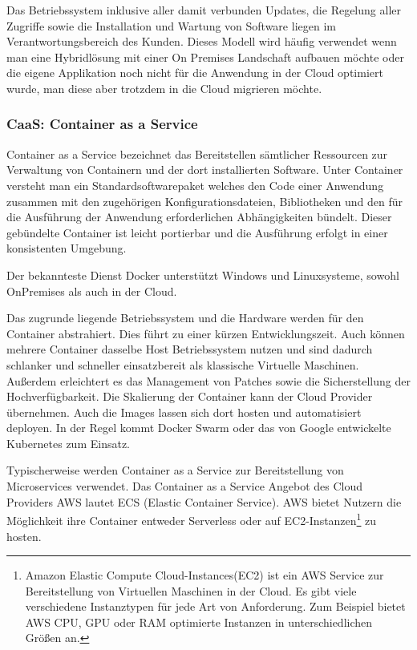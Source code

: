    Das Betriebssystem inklusive aller damit verbunden Updates, die Regelung aller Zugriffe sowie die Installation und Wartung von Software liegen im Verantwortungsbereich des Kunden.
   Dieses Modell wird häufig verwendet wenn man eine Hybridlösung mit einer On Premises Landschaft aufbauen möchte oder die eigene Applikation noch nicht für die Anwendung in der Cloud optimiert wurde, man diese aber trotzdem in die Cloud migrieren möchte.\cite[]{CloudComputingDef}

   \subsubsection{CaaS: Container as a Service}
   Container as a Service bezeichnet das Bereitstellen sämtlicher Ressourcen zur Verwaltung von Containern und der dort installierten Software.
   Unter Container versteht man ein {}\glqq Standardsoftwarepaket \grqq{} welches {}\glqq den Code einer Anwendung zusammen mit den zugehörigen Konfigurationsdateien,
   Bibliotheken und den für die Ausführung der Anwendung erforderlichen Abhängigkeiten \grqq{} bündelt. \cite[]{CaaS}
   Dieser gebündelte Container ist leicht portierbar und die Ausführung erfolgt in einer konsistenten Umgebung.

   Der bekannteste Dienst Docker unterstützt Windows und Linuxsysteme, sowohl OnPremises als auch in der Cloud.

   Das zugrunde liegende Betriebssystem und die Hardware werden für den Container abstrahiert. Dies führt zu einer kürzen Entwicklungszeit.
   Auch können mehrere Container dasselbe Host Betriebssystem nutzen und sind dadurch schlanker und schneller einsatzbereit als klassische Virtuelle Maschinen.
   Außerdem erleichtert es das Management von Patches sowie die Sicherstellung der Hochverfügbarkeit.
   Die Skalierung der Container kann der Cloud Provider übernehmen. Auch die Images lassen sich dort hosten und automatisiert deployen.
   In der Regel kommt Docker Swarm oder das von Google entwickelte Kubernetes zum Einsatz.

   Typischerweise werden Container as a Service zur Bereitstellung von Microservices
   verwendet. Das Container as a Service Angebot des Cloud Providers AWS lautet ECS (Elastic Container Service).
   AWS bietet Nutzern die Möglichkeit ihre Container entweder Serverless oder auf EC2-Instanzen\footnote{Amazon Elastic Compute Cloud-Instances(EC2) ist ein AWS Service
   zur Bereitstellung von Virtuellen Maschinen in der Cloud. Es gibt viele verschiedene Instanztypen für jede Art von Anforderung.
   Zum Beispiel bietet AWS CPU, GPU oder RAM optimierte Instanzen in unterschiedlichen Größen an. } zu hosten. \cite[]{AWSECS}


